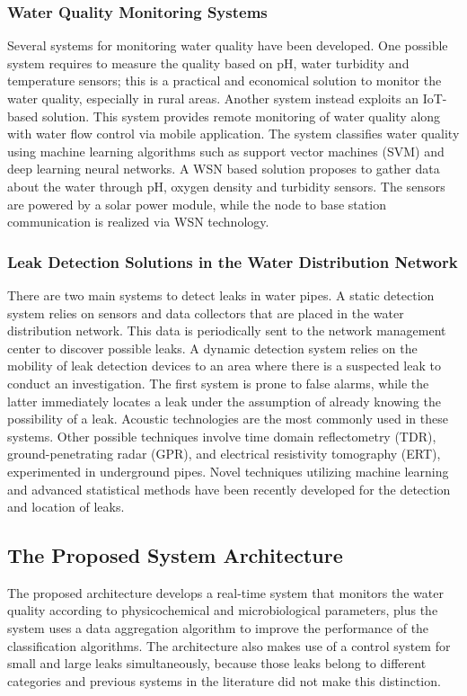 \documentclass[draft, {\secondLanguage}, english]{volcanica-template}
\begin{document}
\subsubsection{Water Quality Monitoring Systems}
Several systems for monitoring water quality have been developed. One possible system requires to measure the quality based on pH, water turbidity and temperature sensors; this is a practical and economical solution to monitor the water quality, especially in rural areas.
Another system instead exploits an IoT-based solution. This system provides remote monitoring of water quality along with water flow control via mobile application. The system classifies water quality using machine learning algorithms such as support vector machines (SVM) and deep learning neural networks.
A WSN based solution proposes to gather data about the water through pH, oxygen density and turbidity sensors. The sensors are powered by a solar power module, while the node to base station communication is realized via WSN technology.

\subsubsection{Leak Detection Solutions in the Water Distribution Network}
There are two main systems to detect leaks in water pipes. A static detection system relies on sensors and data collectors that are placed in the water distribution network. This data is periodically sent to the network management center to discover possible leaks. A dynamic detection system relies on the mobility of leak detection devices to an area where there is a suspected leak to conduct an investigation. The first system is prone to false alarms, while the latter immediately locates a leak under the assumption of already knowing the possibility of a leak. Acoustic technologies are the most commonly used in these systems. Other possible techniques involve time domain reflectometry (TDR), ground-penetrating radar (GPR), and electrical resistivity tomography (ERT), experimented in underground pipes. Novel techniques utilizing machine learning and advanced statistical methods have been recently developed for the detection and location of leaks.

\subsection{The Proposed System Architecture}
The proposed architecture develops a real-time system that monitors the water quality according to physicochemical and microbiological parameters, plus the system uses a data aggregation algorithm to improve the performance of the classification algorithms. The architecture also makes use of a control system for small and large leaks simultaneously, because those leaks belong to different categories and previous systems in the literature did not make this distinction.
\end{document}
